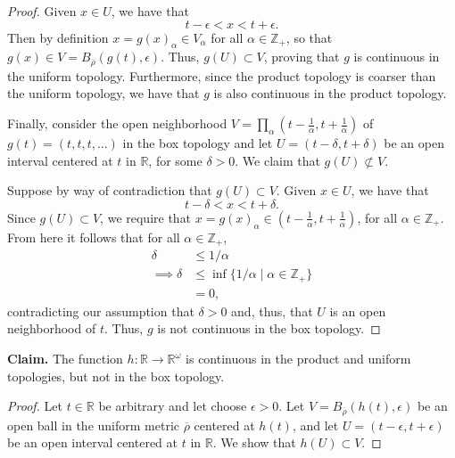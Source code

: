 \documentclass[a4paper,10pt]{article}
\newcommand{\ZZ}{\mathbb{Z}}
\newcommand{\RR}{\mathbb{R}}
\begin{document}
\begin{solution}
\begin{proof}
        Given $x \in U$, we have that
        \begin{equation*}
            t - \epsilon < x < t + \epsilon.
        \end{equation*}
        Then by definition $x = g(x)_\alpha \in V_\alpha$ for all $\alpha \in \ZZ_+$, so that $g(x) \in V = B_{\overline{\rho}}(g(t), \epsilon)$.
        Thus, $g(U) \subset V$, proving that $g$ is continuous in the uniform topology.
        Furthermore, since the product topology is coarser than the uniform topology, we have that $g$ is also continuous in the product topology.

        Finally, consider the open neighborhood $V = \prod_\alpha (t - \tfrac{1}{\alpha}, t + \tfrac{1}{\alpha})$ of $g(t) = (t, t, t, \ldots)$ in the box topology and let $U = (t - \delta, t + \delta)$ be an open interval centered at $t$ in $\RR$, for some $\delta > 0$.
        We claim that $g(U) \not\subset V$.

        Suppose by way of contradiction that $g(U) \subset V$.
        Given $x \in U$, we have that
        \begin{equation*}
            t - \delta < x < t + \delta.
        \end{equation*}
        Since $g(U) \subset V$, we require that $x = g(x)_\alpha \in (t - \tfrac{1}{\alpha}, t + \tfrac{1}{\alpha})$, for all $\alpha \in \ZZ_+$.
        From here it follows that for all $\alpha \in \ZZ_+$,
        \begin{align*}
            \delta          &\leq 1 / \alpha \\
            \implies \delta &\leq \inf\{1 / \alpha \mid \alpha \in \ZZ_+\} \\
                            &= 0,
        \end{align*}
        contradicting our assumption that $\delta > 0$ and, thus, that $U$ is an open neighborhood of $t$.
        Thus, $g$ is not continuous in the box topology.
    \end{proof}
    \bigskip


    \noindent\textbf{Claim.} The function $h: \RR \rightarrow \RR^\omega$ is continuous in the product and uniform topologies, but not in the box topology.
    \begin{proof}
        Let $t \in \RR$ be arbitrary and let choose $\epsilon > 0$.
        Let $V = B_{\overline{\rho}}(h(t), \epsilon)$ be an open ball in the uniform metric $\overline{\rho}$ centered at $h(t)$, and let $U = (t - \epsilon, t + \epsilon)$ be an open interval centered at $t$ in $\RR$.
        We show that $h(U) \subset V$.


\end{proof}
\end{solution}
\end{document}
